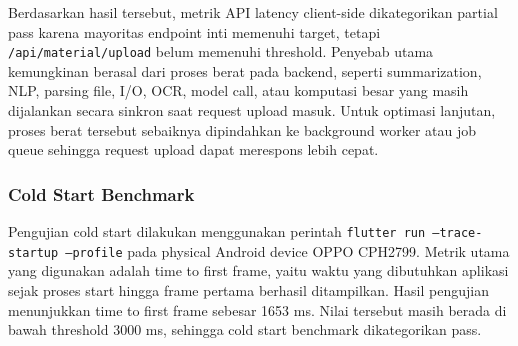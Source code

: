 \documentclass[11pt]{article}
\begin{document}
\begin{center}
\renewcommand{\arraystretch}{1.2}
\end{center}

Berdasarkan hasil tersebut, metrik API latency client-side dikategorikan partial pass karena mayoritas endpoint inti memenuhi target, tetapi \texttt{/api/material/upload} belum memenuhi threshold. Penyebab utama kemungkinan berasal dari proses berat pada backend, seperti summarization, NLP, parsing file, I/O, OCR, model call, atau komputasi besar yang masih dijalankan secara sinkron saat request upload masuk. Untuk optimasi lanjutan, proses berat tersebut sebaiknya dipindahkan ke background worker atau job queue sehingga request upload dapat merespons lebih cepat.


\subsubsection{Cold Start Benchmark}

Pengujian cold start dilakukan menggunakan perintah \texttt{flutter run --trace-startup --profile} pada physical Android device OPPO CPH2799. Metrik utama yang digunakan adalah time to first frame, yaitu waktu yang dibutuhkan aplikasi sejak proses start hingga frame pertama berhasil ditampilkan. Hasil pengujian menunjukkan time to first frame sebesar 1653 ms. Nilai tersebut masih berada di bawah threshold 3000 ms, sehingga cold start benchmark dikategorikan pass.
\end{document}
